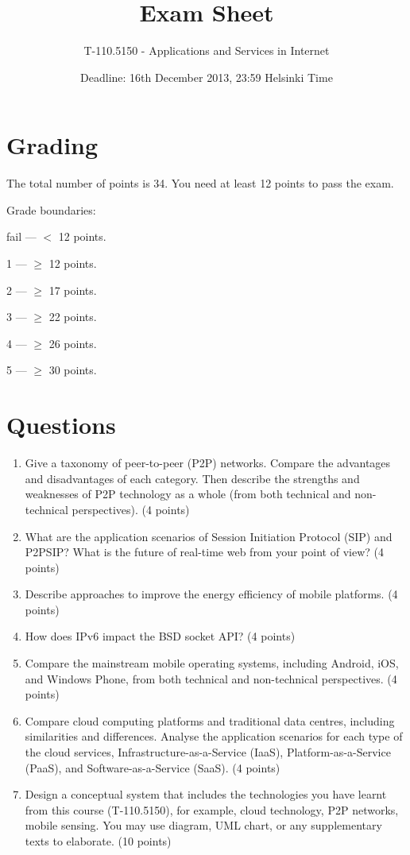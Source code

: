 \documentclass{article}
\title{\vspace{-10pt}Exam Sheet}
\author{T-110.5150 - Applications and Services in Internet}
\date{Deadline: 16th December 2013, 23:59 Helsinki Time}
\begin{document}
\maketitle

\section*{Grading}
\noindent
The total number of points is 34.
You need at least 12 points to pass the exam.

\noindent
Grade boundaries:
\vskip 10pt

fail --- $<$ 12 points.

1 --- $\ge$ 12 points.

2 --- $\ge$ 17 points.

3 --- $\ge$ 22 points.

4 --- $\ge$ 26 points.

5 --- $\ge$ 30 points.

\section*{Questions}

\begin{enumerate}

\item Give a taxonomy of peer-to-peer (P2P) networks. Compare the advantages and disadvantages of each category. Then describe the strengths and weaknesses of P2P technology as a whole (from both technical and non-technical perspectives). (4 points)

\item What are the application scenarios of Session Initiation Protocol (SIP) and P2PSIP? What is the future of real-time web from your point of view? (4 points)

\item Describe approaches to improve the energy efficiency of mobile platforms. (4 points)

\item How does IPv6 impact the BSD socket API? (4 points)

\item Compare the mainstream mobile operating systems, including Android, iOS, and Windows Phone, from both technical and non-technical perspectives. (4 points)

\item Compare cloud computing platforms and traditional data centres, including similarities and differences. Analyse the application scenarios for each type of the cloud services, Infrastructure-as-a-Service (IaaS), Platform-as-a-Service (PaaS), and Software-as-a-Service (SaaS). (4 points)

\item Design a conceptual system that includes the technologies you have learnt from this course (T-110.5150), for example, cloud technology, P2P networks, mobile sensing. You may use diagram, UML chart, or any supplementary texts to elaborate. (10 points)

\end{enumerate}
\end{document}
